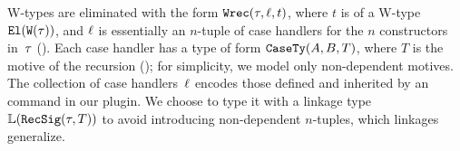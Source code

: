 %

W-types are eliminated with the form $\texttt{Wrec}({\tau},{\ell},{t})$, where $t$ is of a
W-type $\texttt{El}({\texttt{W}({\tau})})$, and $\ell$ is essentially an $n$-tuple of
case handlers for the $n$ constructors in~$\tau$ ().
Each case handler has a type of form $\texttt{CaseTy}({A},{B},{T})$, where
$T$ is the motive of the recursion ();
for simplicity, we model only non-dependent motives.
The collection of case handlers~$\ell$ encodes those defined and inherited
by an  command in our plugin.
We choose to type it with a linkage type $\mathbb{L}({\texttt{RecSig}({\tau},{T})})$
to avoid introducing non-dependent $n$-tuples, which linkages generalize.



